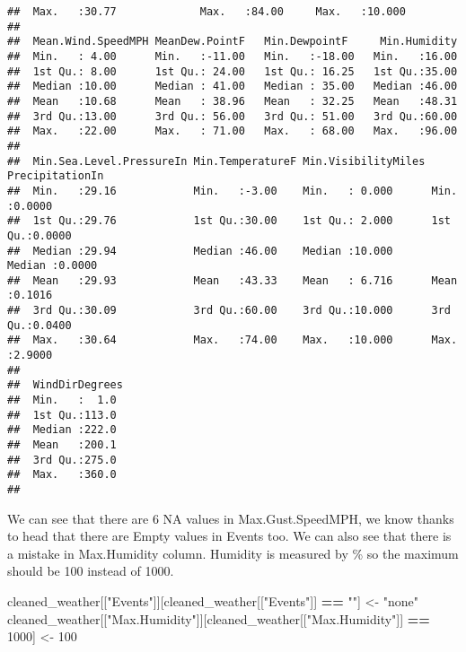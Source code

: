 \documentclass[
]{article}
\newenvironment{Shaded}{\begin{snugshade}}{\end{snugshade}}
\newcommand{\DecValTok}[1]{\textcolor[rgb]{0.00,0.00,0.81}{#1}}
\newcommand{\NormalTok}[1]{#1}
\newcommand{\OperatorTok}[1]{\textcolor[rgb]{0.81,0.36,0.00}{\textbf{#1}}}
\newcommand{\StringTok}[1]{\textcolor[rgb]{0.31,0.60,0.02}{#1}}
\begin{document}
\begin{verbatim}
##  Max.   :30.77             Max.   :84.00     Max.   :10.000      
##                                                                  
##  Mean.Wind.SpeedMPH MeanDew.PointF   Min.DewpointF     Min.Humidity  
##  Min.   : 4.00      Min.   :-11.00   Min.   :-18.00   Min.   :16.00  
##  1st Qu.: 8.00      1st Qu.: 24.00   1st Qu.: 16.25   1st Qu.:35.00  
##  Median :10.00      Median : 41.00   Median : 35.00   Median :46.00  
##  Mean   :10.68      Mean   : 38.96   Mean   : 32.25   Mean   :48.31  
##  3rd Qu.:13.00      3rd Qu.: 56.00   3rd Qu.: 51.00   3rd Qu.:60.00  
##  Max.   :22.00      Max.   : 71.00   Max.   : 68.00   Max.   :96.00  
##                                                                      
##  Min.Sea.Level.PressureIn Min.TemperatureF Min.VisibilityMiles PrecipitationIn 
##  Min.   :29.16            Min.   :-3.00    Min.   : 0.000      Min.   :0.0000  
##  1st Qu.:29.76            1st Qu.:30.00    1st Qu.: 2.000      1st Qu.:0.0000  
##  Median :29.94            Median :46.00    Median :10.000      Median :0.0000  
##  Mean   :29.93            Mean   :43.33    Mean   : 6.716      Mean   :0.1016  
##  3rd Qu.:30.09            3rd Qu.:60.00    3rd Qu.:10.000      3rd Qu.:0.0400  
##  Max.   :30.64            Max.   :74.00    Max.   :10.000      Max.   :2.9000  
##                                                                                
##  WindDirDegrees 
##  Min.   :  1.0  
##  1st Qu.:113.0  
##  Median :222.0  
##  Mean   :200.1  
##  3rd Qu.:275.0  
##  Max.   :360.0  
## 
\end{verbatim}

We can see that there are 6 NA values in Max.Gust.SpeedMPH, we know
thanks to head that there are Empty values in Events too. We can also
see that there is a mistake in Max.Humidity column. Humidity is measured
by \% so the maximum should be 100 instead of 1000.

\begin{Shaded}
\begin{Highlighting}[]
\NormalTok{cleaned_weather[[}\StringTok{"Events"}\NormalTok{]][cleaned_weather[[}\StringTok{"Events"}\NormalTok{]] }\OperatorTok{==}\StringTok{ ""}\NormalTok{] <-}\StringTok{ "none"}
\NormalTok{cleaned_weather[[}\StringTok{"Max.Humidity"}\NormalTok{]][cleaned_weather[[}\StringTok{"Max.Humidity"}\NormalTok{]] }\OperatorTok{==}\StringTok{ }\DecValTok{1000}\NormalTok{] <-}\StringTok{ }\DecValTok{100}
\end{Highlighting}
\end{Shaded}
\end{document}
